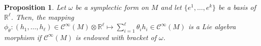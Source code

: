 \documentclass[11pt]{article}
\theoremstyle{plain}
\newtheorem{proposition}[theorem]{Proposition}
\theoremstyle{definition}
\newcommand{\Cinfty}{\mathscr{C}^\infty}
\begin{document}


\begin{proposition} Let $\omega$ be a symplectic form on $M$ and let $\{e^1,\ldots,e^k\}$ be a basis of $\mathbb{R}^\ell$.  Then, the mapping $\phi_\theta:(h_1,\ldots,h_\ell)\in \Cinfty(M)\otimes \mathbb{R}^\ell\mapsto \sum_{i=1}^\ell\theta_ih_i\in \Cinfty(M)$ is a Lie algebra morphism if $\Cinfty(M)$ is endowed with bracket of $\omega$.
\end{proposition}

 
\end{document}
